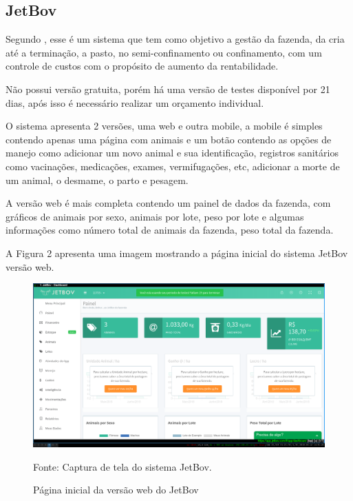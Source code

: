 



\subsection{\textbf{JetBov}}

Segundo , esse é um sistema que tem como objetivo a gestão da fazenda, da cria até a terminação, a pasto, no semi-confinamento ou confinamento, com um controle de custos com o propósito de aumento da rentabilidade.

Não possui versão gratuita, porém há uma versão de testes disponível por 21 dias, após isso é necessário realizar um orçamento individual.

O sistema apresenta 2 versões, uma web e outra mobile, a mobile é simples contendo apenas uma página com animais e um botão contendo as opções de manejo como adicionar um novo animal e sua identificação, registros sanitários como vacinações, medicações, exames, vermifugações, etc, adicionar a morte de um animal, o desmame, o parto e pesagem.

A versão web é mais completa contendo um painel de dados da fazenda, com gráficos de animais por sexo, animais por lote, peso por lote e algumas informações como número total de animais da fazenda, peso total da fazenda.

A Figura 2 apresenta uma imagem mostrando a página inicial do sistema JetBov versão web.

\begin{figure}[H]
	\begin{center}
		\caption{Página inicial da versão web do JetBov}
		\includegraphics[width=\textwidth]{../img/jetbov.png}

		Fonte: Captura de tela do sistema JetBov.
	\end{center}
\end{figure}

